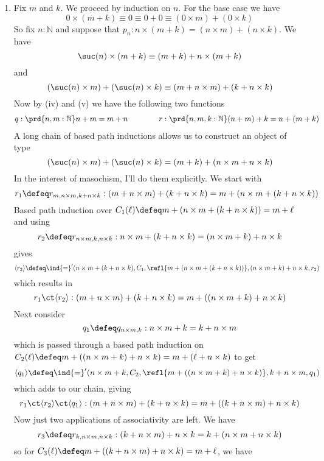 \begin{enumerate}
\item Fix $m$ and $k$.  We proceed by induction on $n$.  For the base case we
have
\[
0 \times (m + k)
\equiv 0
\equiv 0 + 0
\equiv (0 \times m) + (0 \times k)
\]
So fix $n : \mathbb{N}$ and suppose that $p_{n} : n \times (m + k) = (n \times
m) + (n \times k)$.  We have
\[
\suc(n) \times (m + k)
\equiv
(m+k) + n \times (m + k)
\]
and
\[
(\suc(n) \times m) + (\suc(n) \times k)
\equiv
(m + n \times m) + (k + n \times k)
\]
Now by (iv) and (v) we have the following two functions
\begin{align*}
q : \prd{n, m:\mathbb{N}} n + m = m + n
\qquad\qquad
r : \prd{n, m, k:\mathbb{N}} (n + m) + k = n + (m + k)
\end{align*}
A long chain of based path inductions allows us to construct an object of type
\[
(\suc(n) \times m) + (\suc(n) \times k) = (m+k) + (n \times m + n \times k)
\]
In the interest of masochism, I'll do them explicitly.  We start with
    \[
    r_{1} \defeq r_{m, n \times m, k+n\times k} 
    : (m + n \times m) + (k + n \times k)
    = m + (n \times m + (k + n \times k))
    \]
    Based path induction over $C_{1}(\ell) \defeq m + (n \times m + (k + n \times
    k)) = m + \ell$ and using
    \[
    r_{2} \defeq r_{n \times m, k, n \times k}
    : n \times m + (k + n \times k)
    = (n \times m + k) + n \times k
    \]
    gives
    \[
    \langle r_{2} \rangle \defeq 
    \ind{=}'(n\times m + (k + n \times k), C_{1}, \refl{m+(n\times m + (k + n
    \times k))}, (n \times m + k) + n \times k, r_{2}
    )
    \]
    which results in
    \[
    r_{1} 
    \ct
    \langle r_{2} \rangle
    :
    (m + n \times m) + (k + n \times k)
    =
    m + ((n \times m + k) + n \times k)
    \]
    Next consider
    \[
    q_{1} \defeq q_{n\times m, k} : n \times m + k = k + n \times m
    \]
    which is passed through a based path induction on $C_{2}(\ell) \defeq m + ((n
    \times m + k) + n \times k) =  m + (\ell
    + n \times k)$ to get
    \[
    \langle q_{1} \rangle
    \defeq
    \ind{=}'(n \times m + k, C_{2}, \refl{m + ((n \times m + k) + n \times k)}, k + n
    \times m, q_{1})
    \]
    which adds to our chain, giving
    \[
    r_{1} \ct \langle r_{2} \rangle \ct \langle q_{1} \rangle
    :
    (m + n \times m) + (k + n \times k)
    =
    m + ((k + n \times m) + n \times k)
    \]
    Now just two applications of associativity are left.  We have
    \[
    r_{3} \defeq r_{k, n \times m, n \times k}
    :
    (k + n \times m) + n \times k
    =
    k + (n \times m + n \times k)
    \]
    so for $C_{3}(\ell) \defeq m + ((k + n \times m) + n \times k) = m + \ell$, we have

\end{enumerate}
